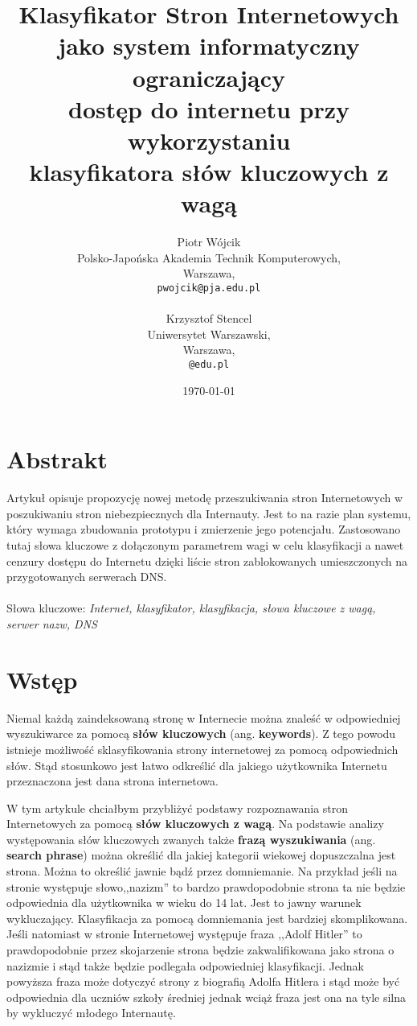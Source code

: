 \documentclass[9pt,twoside,a4paper]{article}
\title{Klasyfikator Stron Internetowych\\ jako system informatyczny ograniczający\\ dostęp do internetu przy wykorzystaniu\\ klasyfikatora słów kluczowych z wagą\\}
\author{Piotr Wójcik\\
    Polsko-Japońska Akademia Technik Komputerowych,\\
    Warszawa,\\
    \texttt{pwojcik@pja.edu.pl}\\
\\
    Krzysztof Stencel\\
    Uniwersytet Warszawski,\\
    Warszawa,\\
    \texttt{@edu.pl}}
\date{\today}
\begin{document}
\maketitle



\section{Abstrakt}
\indent Artykuł opisuje propozycję nowej metodę przeszukiwania stron Internetowych w poszukiwaniu stron niebezpiecznych dla Internauty. Jest to na razie plan systemu, który wymaga zbudowania prototypu i zmierzenie jego potencjału. Zastosowano tutaj słowa kluczowe z dołączonym parametrem wagi w celu klasyfikacji a nawet cenzury dostępu do Internetu dzięki liście stron zablokowanych umieszczonych na przygotowanych serwerach DNS.\\
\\
Słowa kluczowe:
\textit{Internet, klasyfikator, klasyfikacja, słowa kluczowe z wagą, serwer nazw, DNS}

\section{Wstęp}

\indent Niemal każdą zaindeksowaną stronę w Internecie można znaleść w odpowiedniej wyszukiwarce za pomocą \textbf{słów kluczowych} (ang.\textbf{ keywords}). Z tego powodu istnieje możliwość sklasyfikowania strony internetowej za pomocą odpowiednich słów. Stąd stosunkowo jest łatwo odkreślić dla jakiego użytkownika Internetu przeznaczona jest dana strona internetowa.

W tym artykule chciałbym przybliżyć podstawy rozpoznawania stron Internetowych za pomocą \textbf{słów kluczowych z wagą}. Na podstawie analizy występowania słów kluczowych zwanych także \textbf{frazą wyszukiwania} (ang. \textbf{search phrase}) można określić dla jakiej kategorii wiekowej dopuszczalna jest strona. Można to określić jawnie bądź przez domniemanie. Na przykład jeśli na stronie występuje słowo,,nazizm'' to bardzo prawdopodobnie strona ta nie będzie odpowiednia dla użytkownika w wieku do 14 lat. Jest to jawny warunek wykluczający. Klasyfikacja za pomocą domniemania jest bardziej skomplikowana. Jeśli natomiast w stronie Internetowej występuje fraza ,,Adolf Hitler'' to prawdopodobnie przez skojarzenie strona będzie zakwalifikowana jako strona o nazizmie i stąd także będzie podlegała odpowiedniej klasyfikacji. Jednak powyższa fraza może dotyczyć strony z biografią Adolfa Hitlera i stąd może być odpowiednia dla uczniów szkoły średniej jednak wciąż fraza jest ona na tyle silna by wykluczyć młodego Internautę. 
\end{document}
